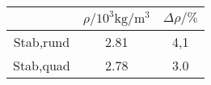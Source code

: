 \label{tab:tabFehler}
	\begin{tabular}{cS[table-format=1.2]S[table-format=1.1]}
		\toprule
		{} & {$\rho/10^3\si{\kilogram\per\cubic\metre}$} & {$\Delta\rho/\%$}\\
		\midrule
		Stab,rund & 2.81 & 4,1\\
		Stab,quad & 2.78 & 3.0\\
		\bottomrule
	\end{tabular}

